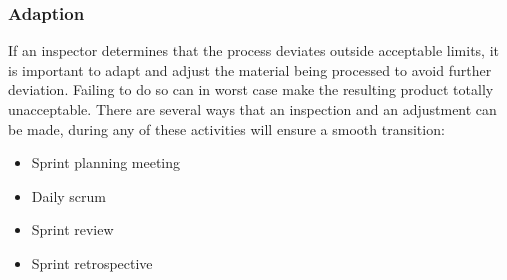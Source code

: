 \subsubsection{Adaption}


If an inspector determines that the process deviates outside acceptable limits, it is important to adapt and adjust the material being processed to avoid further deviation\cite{scrumguide11}. Failing to do so can in worst case make the resulting product totally unacceptable\cite{scrumguide11}.
There are several ways that an inspection and an adjustment can be made, during any of these activities will ensure a smooth transition:

\begin{itemize}
	\item Sprint planning meeting
	\item	Daily scrum
	\item	Sprint review
	\item	Sprint retrospective
\end{itemize}